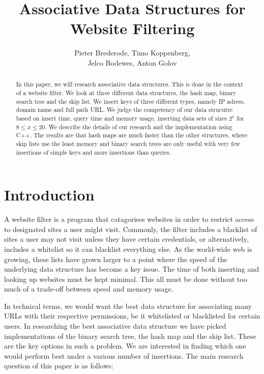 \documentclass[12pt,a4paper]{article}
\title{Associative Data Structures for Website Filtering}
\author{Pieter Brederode, Timo Koppenberg, \\ Jelco Bodewes, Anton Golov}
\begin{document}
    \maketitle

    \begin{abstract}
        In this paper, we will research associative data structures. This is done in the context of
        a website filter. We look at three different data structures, the hash map, binary search tree
        and the skip list. We insert keys of three different types, namely IP adress, domain name and
        full path URL. We judge the competency of our data strucutre based on insert time, query time
        and memory usage, inserting data sets of sizes $2^x$ for $8 \le x \le 20$. We describe the details
        of our research and the implementation using C++. The results are that hash maps are much faster
        than the other structures, where skip lists use the least memory and binary search trees are
        only useful with very few insertions of simple keys and more insertions than queries.
    \end{abstract}


    \section{Introduction}
    A website filter is a program that catagorises websites in order to restrict access to designated
    sites a user might visit. Commonly, the filter includes a blacklist of sites a user may not visit
    unless they have certain credentials, or alternatively, includes a whitelist so it can blacklist
    everything else. As the world-wide web is growing, these lists have grown larger to a point where
    the speed of the underlying data structure has become a key issue. The time of both inserting and
    looking up websites must be kept minimal. This all must be done without too much of a trade-off
    between speed and memory usage.
    
    In technical terms, we would want the best data structure for associating many URLs with their
    respective permissions, be it whitelisted or blacklisted for certain users. In researching the best
    associative data structure we have picked implementations of the binary search tree, the hash map
    and the skip list. These are the key options in such a problem. We are interested in finding which
    one would perform best under a various number of insertions. The main research question of this paper
    is as follows:
    
\end{document}
